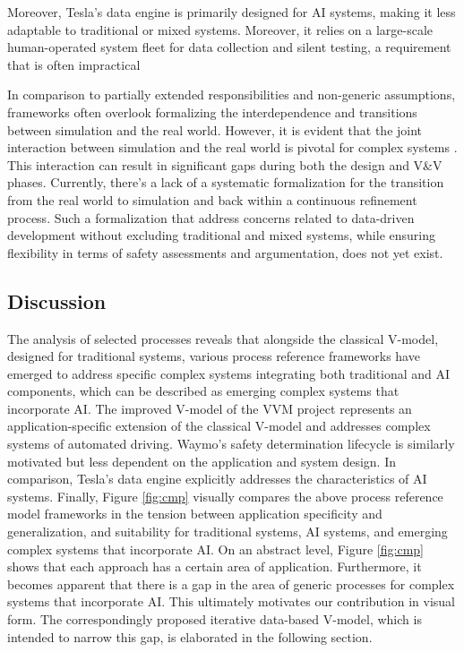 Moreover, Tesla's data engine \cite{karpathy_cvpr21} is primarily designed for AI systems, making it less adaptable to traditional or mixed systems. Moreover, it relies on a large-scale human-operated system fleet for data collection and silent testing, a requirement that is often impractical

In comparison to partially extended responsibilities and non-generic assumptions, frameworks often overlook formalizing the interdependence and transitions between simulation and the real world. However, it is evident that the joint interaction between simulation and the real world  is pivotal for complex systems \cite{KIDeltaSynData, KIAbsicherungSynData}. This interaction can result in significant gaps \cite{burton2023closing, burton2023addressing} during both the design and V\&V phases. Currently, there's a lack of a systematic formalization for the transition from the real world to simulation and back within a continuous refinement process. Such a formalization that address concerns related to data-driven development without excluding traditional and mixed systems, while ensuring flexibility in terms of safety assessments and argumentation, does not yet exist. 

\subsection{Discussion}
The analysis of selected processes reveals that alongside the classical V-model, designed for traditional systems, various process reference frameworks have emerged to address specific complex systems integrating both traditional and AI components, which can be described as emerging complex systems that incorporate AI. The improved V-model of the VVM project represents an application-specific extension of the classical V-model and addresses complex systems of automated driving. Waymo's safety determination lifecycle is similarly motivated but less dependent on the application and system design. In comparison, Tesla's data engine explicitly addresses the characteristics of AI systems. Finally, Figure \ref{fig:cmp} visually compares the above process reference model frameworks in the tension between application specificity and generalization, and suitability for traditional systems, AI systems, and emerging complex systems that incorporate AI. On an abstract level, Figure \ref{fig:cmp} shows that each approach has a certain area of application. Furthermore, it becomes apparent that there is a gap in the area of generic processes for complex systems that incorporate AI. This ultimately motivates our contribution in visual form. The correspondingly proposed iterative data-based V-model, which is intended to narrow this gap, is elaborated in the following section.  
 
